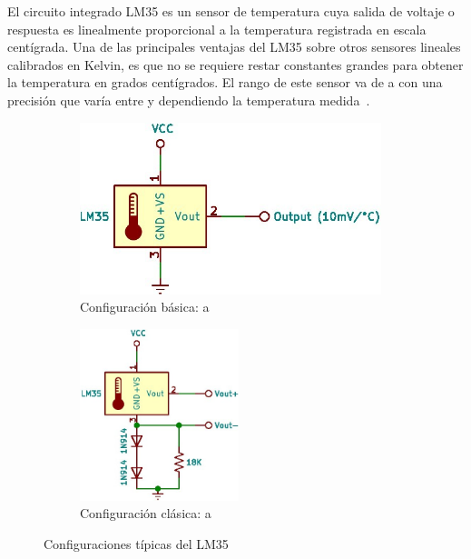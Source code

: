 %
%




El circuito integrado LM35 es un sensor de temperatura cuya salida de voltaje o respuesta es linealmente proporcional a la temperatura registrada en escala centígrada.
Una de las principales ventajas del LM35 sobre otros sensores lineales calibrados en Kelvin, es que no se requiere restar constantes grandes para obtener la temperatura en grados centígrados.
El rango de este sensor va de  a  con una precisión que varía entre  y  dependiendo la temperatura medida~.

\begin{figure}
	\centering
	\begin{subfigure}[b]{0.5\columnwidth}
		\centering
		\includegraphics[width=\textwidth,height=5cm,keepaspectratio]{img/lm35a.jpg}
		\caption{Configuración básica:  a }
		\label{fig:lm35config-a} %
	\end{subfigure}%
	\begin{subfigure}[b]{0.5\columnwidth}
		\centering
		\includegraphics[width=\textwidth,height=5cm,keepaspectratio]{img/lm35b.jpg}
		\caption{Configuración clásica:  a }
		\label{fig:lm35config-b} %
	\end{subfigure}
	\caption{Configuraciones típicas del LM35}
	\label{fig:lm35config} %
\end{figure}

